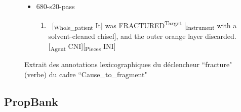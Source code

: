 \documentclass[xcolor=table]{beamer}
\begin{document}
\begin{frame}
\begin{figure}
\begin{itemize}
			\item 680-s20-pass
			\begin{enumerate}\tiny
				\item \ [\textsubscript{\color{red}Whole\_patient} It] was FRACTURED\textsuperscript{\color{red}Target} [\textsubscript{\color{red}Instrument} with a solvent-cleaned chisel], and the outer orange layer discarded. [\textsubscript{\color{red}Agent} CNI][\textsubscript{\color{red}Pieces} INI] 
			\end{enumerate}
			
		\end{itemize}
		
		\caption{Extrait des annotations lexicographiques du déclencheur ``fracture" (verbe) du cadre ``Cause\_to\_fragment"}
	\end{figure}
	
\end{frame}

\subsection{PropBank}
\end{document}
